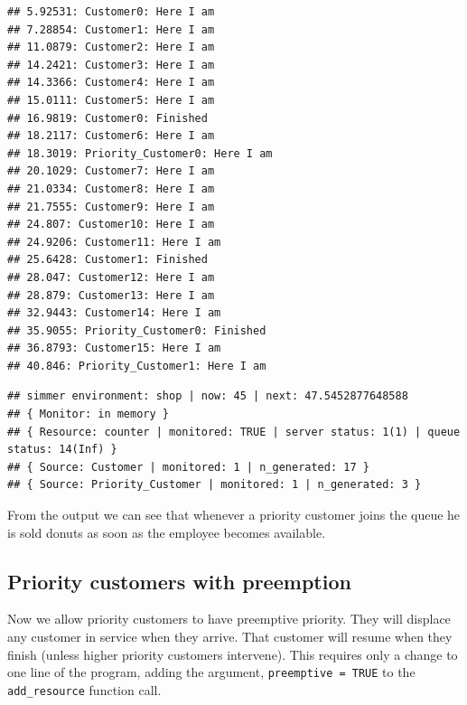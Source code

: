 \documentclass[
]{book}
\begin{document}
\begin{verbatim}
## 5.92531: Customer0: Here I am
## 7.28854: Customer1: Here I am
## 11.0879: Customer2: Here I am
## 14.2421: Customer3: Here I am
## 14.3366: Customer4: Here I am
## 15.0111: Customer5: Here I am
## 16.9819: Customer0: Finished
## 18.2117: Customer6: Here I am
## 18.3019: Priority_Customer0: Here I am
## 20.1029: Customer7: Here I am
## 21.0334: Customer8: Here I am
## 21.7555: Customer9: Here I am
## 24.807: Customer10: Here I am
## 24.9206: Customer11: Here I am
## 25.6428: Customer1: Finished
## 28.047: Customer12: Here I am
## 28.879: Customer13: Here I am
## 32.9443: Customer14: Here I am
## 35.9055: Priority_Customer0: Finished
## 36.8793: Customer15: Here I am
## 40.846: Priority_Customer1: Here I am
\end{verbatim}

\begin{verbatim}
## simmer environment: shop | now: 45 | next: 47.5452877648588
## { Monitor: in memory }
## { Resource: counter | monitored: TRUE | server status: 1(1) | queue status: 14(Inf) }
## { Source: Customer | monitored: 1 | n_generated: 17 }
## { Source: Priority_Customer | monitored: 1 | n_generated: 3 }
\end{verbatim}

From the output we can see that whenever a priority customer joins the queue he is sold donuts as soon as the employee becomes available.

\hypertarget{priority-customers-with-preemption}{%
\subsection{Priority customers with preemption}\label{priority-customers-with-preemption}}

Now we allow priority customers to have preemptive priority. They will displace any customer in service when they arrive. That customer will resume when they finish (unless higher priority customers intervene). This requires only a change to one line of the program, adding the argument, \texttt{preemptive\ =\ TRUE} to the \texttt{add\_resource} function call.
\end{document}
